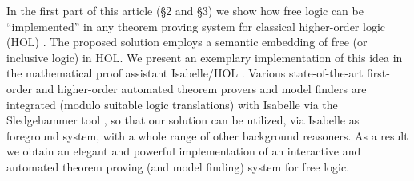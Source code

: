 In the first part of this article (\S2 and \S3) we show how free logic can be
``implemented'' in any theorem proving system for classical
higher-order logic (HOL) \cite{B5}. The proposed solution employs a
semantic embedding of free (or inclusive logic) in HOL. We present an
exemplary implementation of this idea in the mathematical proof
assistant Isabelle/HOL \cite{NPW02}. Various state-of-the-art
first-order and higher-order automated theorem provers and model
finders are integrated (modulo suitable logic translations) with
Isabelle via the Sledgehammer tool \cite{Sledgehammer}, so that our
solution can be utilized, via Isabelle as foreground system, with a
whole range of other background reasoners. As a result we obtain an
elegant and powerful implementation of an interactive and automated
theorem proving (and model finding) system for free logic.





 
  
